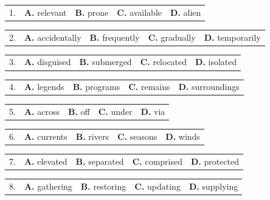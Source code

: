 \documentclass[UTF8,11pt]{ctexart}
\begin{document}
\noindent\begin{tabularx}{\linewidth}{@{}lXXXX@{}}1. & \textbf{A.} relevant & \textbf{B.} prone & \textbf{C.} available & \textbf{D.} alien\\\end{tabularx}\par

\noindent\begin{tabularx}{\linewidth}{@{}lXXXX@{}}2. & \textbf{A.} accidentally & \textbf{B.} frequently & \textbf{C.} gradually & \textbf{D.} temporarily\\\end{tabularx}\par

\noindent\begin{tabularx}{\linewidth}{@{}lXXXX@{}}3. & \textbf{A.} disguised & \textbf{B.} submerged & \textbf{C.} relocated & \textbf{D.} isolated\\\end{tabularx}\par

\noindent\begin{tabularx}{\linewidth}{@{}lXXXX@{}}4. & \textbf{A.} legends & \textbf{B.} programs & \textbf{C.} remains & \textbf{D.} surroundings\\\end{tabularx}\par

\noindent\begin{tabularx}{\linewidth}{@{}lXXXX@{}}5. & \textbf{A.} across & \textbf{B.} off & \textbf{C.} under & \textbf{D.} via\\\end{tabularx}\par

\noindent\begin{tabularx}{\linewidth}{@{}lXXXX@{}}6. & \textbf{A.} currents & \textbf{B.} rivers & \textbf{C.} seasons & \textbf{D.} winds\\\end{tabularx}\par

\noindent\begin{tabularx}{\linewidth}{@{}lXXXX@{}}7. & \textbf{A.} elevated & \textbf{B.} separated & \textbf{C.} comprised & \textbf{D.} protected\\\end{tabularx}\par

\noindent\begin{tabularx}{\linewidth}{@{}lXXXX@{}}8. & \textbf{A.} gathering & \textbf{B.} restoring & \textbf{C.} updating & \textbf{D.} supplying\\\end{tabularx}\par
\end{document}
